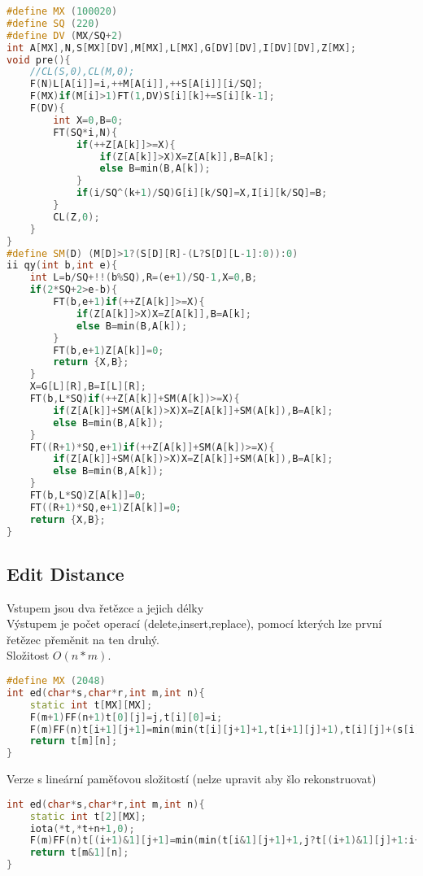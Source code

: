 \documentclass[11pt]{article}
\begin{document}
\begin{lstlisting}[language=C++]
#define MX (100020)
#define SQ (220)
#define DV (MX/SQ+2)
int A[MX],N,S[MX][DV],M[MX],L[MX],G[DV][DV],I[DV][DV],Z[MX];
void pre(){
    //CL(S,0),CL(M,0);
    F(N)L[A[i]]=i,++M[A[i]],++S[A[i]][i/SQ];
    F(MX)if(M[i]>1)FT(1,DV)S[i][k]+=S[i][k-1];
    F(DV){
        int X=0,B=0;
        FT(SQ*i,N){
            if(++Z[A[k]]>=X){
                if(Z[A[k]]>X)X=Z[A[k]],B=A[k];
                else B=min(B,A[k]);
            }
            if(i/SQ^(k+1)/SQ)G[i][k/SQ]=X,I[i][k/SQ]=B;
        }
        CL(Z,0);
    }
}
#define SM(D) (M[D]>1?(S[D][R]-(L?S[D][L-1]:0)):0)
ii qy(int b,int e){
    int L=b/SQ+!!(b%SQ),R=(e+1)/SQ-1,X=0,B;
    if(2*SQ+2>e-b){
        FT(b,e+1)if(++Z[A[k]]>=X){
            if(Z[A[k]]>X)X=Z[A[k]],B=A[k];
            else B=min(B,A[k]);
        }
        FT(b,e+1)Z[A[k]]=0;
        return {X,B};
    }
    X=G[L][R],B=I[L][R];
    FT(b,L*SQ)if(++Z[A[k]]+SM(A[k])>=X){
        if(Z[A[k]]+SM(A[k])>X)X=Z[A[k]]+SM(A[k]),B=A[k];
        else B=min(B,A[k]);
    }
    FT((R+1)*SQ,e+1)if(++Z[A[k]]+SM(A[k])>=X){
        if(Z[A[k]]+SM(A[k])>X)X=Z[A[k]]+SM(A[k]),B=A[k];
        else B=min(B,A[k]);
    }
    FT(b,L*SQ)Z[A[k]]=0;
    FT((R+1)*SQ,e+1)Z[A[k]]=0;
    return {X,B};
}
\end{lstlisting}
\subsection{Edit Distance}
Vstupem jsou dva řetězce a jejich délky
\\Výstupem je počet operací (delete,insert,replace), pomocí kterých lze první řetězec přeměnit na ten druhý.
\\Složitost $O(n*m)$.
\begin{lstlisting}[language=C++]
#define MX (2048)
int ed(char*s,char*r,int m,int n){
    static int t[MX][MX];
    F(m+1)FF(n+1)t[0][j]=j,t[i][0]=i;
    F(m)FF(n)t[i+1][j+1]=min(min(t[i][j+1]+1,t[i+1][j]+1),t[i][j]+(s[i]!=r[j]));
    return t[m][n];
}
\end{lstlisting}
Verze s lineární paměťovou složitostí (nelze upravit aby šlo rekonstruovat)
\begin{lstlisting}[language=C++]
int ed(char*s,char*r,int m,int n){
    static int t[2][MX];
    iota(*t,*t+n+1,0);
    F(m)FF(n)t[(i+1)&1][j+1]=min(min(t[i&1][j+1]+1,j?t[(i+1)&1][j]+1:i+2),(j?t[i&1][j]:i)+(s[i]!=r[j]));
    return t[m&1][n];
}
\end{lstlisting}
\end{document}
